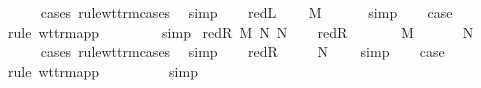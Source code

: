 \begin{isabellebody}
\ \ \ \ \isamarkupfalse%
\ {\isacharparenleft}cases\ rule{\isacharcolon}wt{\isacharunderscore}trm{\isachardot}cases{\isacharparenright}\ \isamarkupfalse%
\ simp\isanewline
\ \ \isamarkupfalse%
\ red{\isacharunderscore}L{\isacharparenleft}{}{\isacharparenright}\ \isamarkupfalse%
\ {\isachardoublequoteopen}{\isasymGamma}\ {\isasymturnstile}\ M{\isacharprime}\ {\isacharcolon}\ {\isasymtau}\ {\isasymrightarrow}\ {\isasymsigma}{\isachardoublequoteclose}\ \isamarkupfalse%
\ simp\isanewline
\ \ \isamarkupfalse%
\ {\isacharquery}case\ \isanewline
\ \ \ \ \isamarkupfalse%
\ {\isacharparenleft}rule\ wt{\isacharunderscore}trm{\isachardot}app{\isacharparenright}\isanewline
\ \ \ \ \isamarkupfalse%
\ {}\ \isamarkupfalse%
\ simp\isanewline
{}\isamarkupfalse%
\isanewline
{}\isamarkupfalse%
\ {\isacharparenleft}red{\isacharunderscore}R\ M\ N\ N{\isacharprime}{\isacharparenright}\isanewline
\ \ \isamarkupfalse%
\ red{\isacharunderscore}R{\isacharparenleft}{}{\isacharparenright}\ \isamarkupfalse%
\ {\isasymtau}\ \ {}{\isacharcolon}\ {\isachardoublequoteopen}{\isasymGamma}\ {\isasymturnstile}\ M\ {\isacharcolon}\ {\isasymtau}\ {\isasymrightarrow}\ {\isasymsigma}{\isachardoublequoteclose}\ {\isachardoublequoteopen}{\isasymGamma}\ {\isasymturnstile}\ N\ {\isacharcolon}\ {\isasymtau}{\isachardoublequoteclose}\isanewline
\ \ \ \ \isamarkupfalse%
\ {\isacharparenleft}cases\ rule{\isacharcolon}wt{\isacharunderscore}trm{\isachardot}cases{\isacharparenright}\ \isamarkupfalse%
\ simp\isanewline
\ \ \isamarkupfalse%
\ red{\isacharunderscore}R{\isacharparenleft}{}{\isacharparenright}\ \isamarkupfalse%
\ {}{\isacharcolon}\ {\isachardoublequoteopen}{\isasymGamma}\ {\isasymturnstile}\ N{\isacharprime}\ {\isacharcolon}\ {\isasymtau}{\isachardoublequoteclose}\ \isamarkupfalse%
\ simp\isanewline
\ \ \isamarkupfalse%
\ {\isacharquery}case\ \isanewline
\ \ \ \ \isamarkupfalse%
\ {\isacharparenleft}rule\ wt{\isacharunderscore}trm{\isachardot}app{\isacharparenright}\isanewline
\ \ \ \ \isamarkupfalse%
\ {}\ {}\ \isamarkupfalse%
\ simp{\isacharplus}\isanewline
{}\isamarkupfalse%
\isanewline
{}\isamarkupfalse%

\end{isabellebody}
